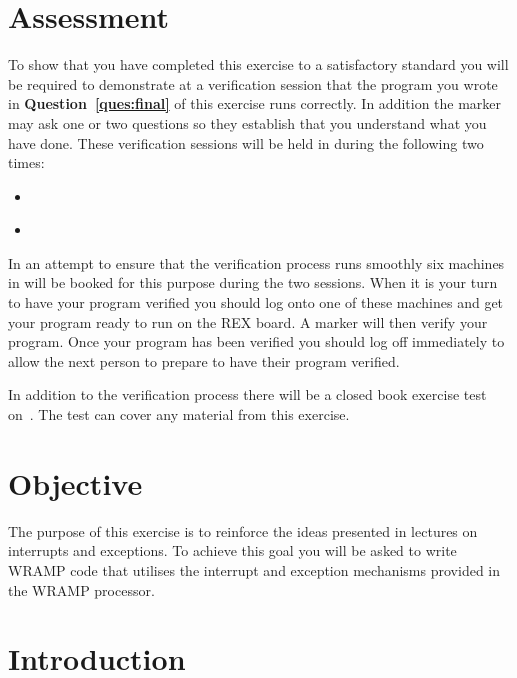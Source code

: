 \documentclass[a4paper,10pt]{article}
\begin{document}


\section{Assessment}

To show that you have completed this exercise to a satisfactory
standard you will be required to demonstrate at a verification session
that the program you wrote in \textbf{Question~\ref{ques:final}} of
this exercise runs correctly. In addition the marker may ask one or
two questions so they establish that you understand what you have
done.  These verification sessions will be held in \ASSESSROOM during the
following two times:

\begin{itemize}
\item \INTERDUE~\MORNINGASSESS
\item \INTERDUE~\AFTERNOONASSESS
\end{itemize}

In an attempt to ensure that the verification process runs smoothly
six machines in \ASSESSROOM will be booked for this purpose during the two
sessions. When it is your turn to have your program verified you
should log onto one of these machines and get your program ready to
run on the REX board. A marker will then verify your program. Once
your program has been verified you should log off immediately to allow
the next person to prepare to have their program verified.

In addition to the verification process there will be a closed book
exercise test on~\textbf{\TESTTWO}. The test can cover any material
from this exercise.

\section{Objective}

The purpose of this exercise is to reinforce the ideas presented in
lectures on interrupts and exceptions. To achieve this goal you will
be asked to write WRAMP code that utilises the interrupt and exception
mechanisms provided in the WRAMP processor.

\section{Introduction}
\end{document}
